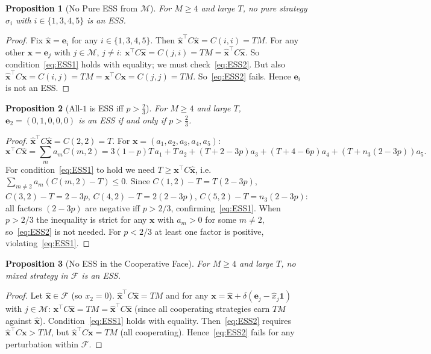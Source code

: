 \documentclass[12pt,a4paper]{article}
\newtheorem{proposition}{Proposition}[section]
\begin{document}
\begin{proposition}[No Pure ESS from $\mathcal{M}$]\label{prop:noESS_coop}
For $M\geq 4$ and large $T$, no pure strategy $\sigma_i$ with
$i\in\{1,3,4,5\}$ is an ESS.
\end{proposition}

\begin{proof}
Fix $\hat{\mathbf{x}}=\mathbf{e}_i$ for any $i\in\{1,3,4,5\}$.  Then
$\hat{\mathbf{x}}^\top C\hat{\mathbf{x}}=C(i,i)=TM$.  For any other
$\mathbf{x}=\mathbf{e}_j$ with $j\in\mathcal{M}$, $j\neq i$:
$\mathbf{x}^\top C\hat{\mathbf{x}}=C(j,i)=TM=\hat{\mathbf{x}}^\top C\hat{\mathbf{x}}$.
So condition~\eqref{eq:ESS1} holds with equality; we must check~\eqref{eq:ESS2}.
But also $\hat{\mathbf{x}}^\top C\mathbf{x}=C(i,j)=TM=\mathbf{x}^\top C\mathbf{x}=C(j,j)=TM$.
So~\eqref{eq:ESS2} fails.  Hence $\mathbf{e}_i$ is not an ESS.
\end{proof}

\begin{proposition}[All-$1$ is ESS iff $p>\tfrac{2}{3}$]\label{prop:ESSA1}
For $M\geq 4$ and large $T$, $\mathbf{e}_2=(0,1,0,0,0)$ is an ESS if and
only if $p>\tfrac{2}{3}$.
\end{proposition}

\begin{proof}
$\hat{\mathbf{x}}^\top C\hat{\mathbf{x}}=C(2,2)=T$.
For $\mathbf{x}=(a_1,a_2,a_3,a_4,a_5)$:
\[
  \mathbf{x}^\top C\hat{\mathbf{x}} = \sum_m a_m C(m,2)
  = 3(1-p)T\,a_1 + T\,a_2 + (T+2-3p)a_3 + (T+4-6p)a_4 + (T+n_3(2-3p))a_5.
\]
For condition~\eqref{eq:ESS1} to hold we need $T\geq \mathbf{x}^\top C\hat{\mathbf{x}}$, i.e.\
$\sum_{m\neq 2}a_m(C(m,2)-T)\leq 0$.  Since
$C(1,2)-T=T(2-3p)$, $C(3,2)-T=2-3p$, $C(4,2)-T=2(2-3p)$, $C(5,2)-T=n_3(2-3p)$:
all factors $(2-3p)$ are negative iff $p>2/3$, confirming~\eqref{eq:ESS1}.
When $p>2/3$ the inequality is strict for any $\mathbf{x}$ with $a_m>0$ for
some $m\neq 2$, so~\eqref{eq:ESS2} is not needed.  For $p<2/3$ at least one
factor is positive, violating~\eqref{eq:ESS1}.
\end{proof}

\begin{proposition}[No ESS in the Cooperative Face]\label{prop:noESS_face}
For $M\geq 4$ and large $T$, no mixed strategy in $\mathcal{F}$ is an ESS.
\end{proposition}

\begin{proof}
Let $\hat{\mathbf{x}}\in\mathcal{F}$ (so $x_2=0$).
$\hat{\mathbf{x}}^\top C\hat{\mathbf{x}}=TM$ and for any
$\mathbf{x}=\hat{\mathbf{x}}+\delta(\mathbf{e}_j-\hat{x}_j\mathbf{1})$ with
$j\in\mathcal{M}$:
$\mathbf{x}^\top C\hat{\mathbf{x}}=TM=\hat{\mathbf{x}}^\top C\hat{\mathbf{x}}$
(since all cooperating strategies earn $TM$ against $\hat{\mathbf{x}}$).
Condition~\eqref{eq:ESS1} holds with equality.  Then~\eqref{eq:ESS2} requires
$\hat{\mathbf{x}}^\top C\mathbf{x}>TM$, but
$\hat{\mathbf{x}}^\top C\mathbf{x}=TM$ (all cooperating).  Hence~\eqref{eq:ESS2}
fails for any perturbation within $\mathcal{F}$.
\end{proof}
\end{document}
